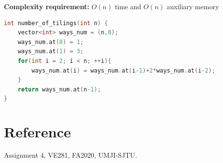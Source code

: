 \documentclass[11pt]{exam}
\begin{document}
\textbf{Complexity requirement:} $O(n)$ time and $O(n)$ auxiliary memory

\begin{solution}
\begin{lstlisting}[language=c++]
int number_of_tilings(int n) {
    vector<int> ways_num = (n,0);
    ways_num.at(0) = 1;
    ways_num.at(1) = 3;
    for(int i = 2; i < n; ++i){
        ways_num.at(i) = ways_num.at(i-1)+2*ways_num.at(i-2);
    }
    return ways_num.at(n-1);
}
\end{lstlisting}
\end{solution}
\section*{Reference}
Assignment 4, VE281, FA2020, UMJI-SJTU.
\end{document}

